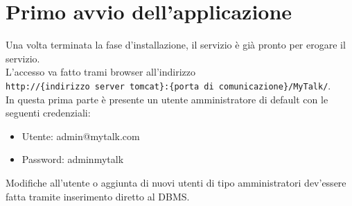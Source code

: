 \section{Primo avvio dell'applicazione}{
Una volta terminata la fase d'installazione, il servizio è già pronto per erogare il servizio.\\
L'accesso va fatto trami browser all'indirizzo\\
\texttt{http://\{indirizzo server tomcat\}:\{porta di comunicazione\}/MyTalk/}.\\
In questa prima parte è presente un utente amministratore di default con le seguenti credenziali:
\begin{itemize}
	\item Utente: admin@mytalk.com
	\item Password: adminmytalk
\end{itemize}
Modifiche all'utente o aggiunta di nuovi utenti di tipo amministratori dev'essere fatta tramite inserimento diretto al DBMS.
}